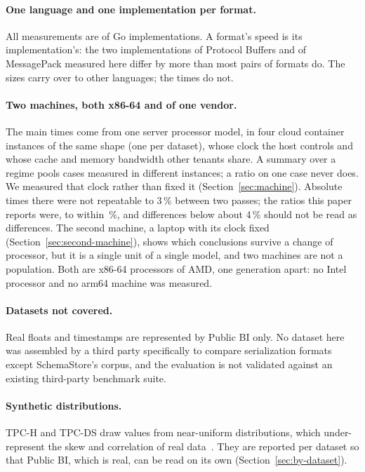 \paragraph{One language and one implementation per format.} All measurements
are of Go implementations. A format's speed is its implementation's: the
two implementations of Protocol Buffers and of MessagePack measured here
differ by more than most pairs of formats do. The sizes carry over to other
languages; the times do not.

\paragraph{Two machines, both x86-64 and of one vendor.} The main times come from one server
processor model, in four cloud container instances of the same shape (one
per dataset), whose clock the host controls and whose cache and memory
bandwidth other tenants share. A summary over a regime pools cases measured
in different instances; a ratio on one case never does. We measured that
clock rather than fixed it (Section~\ref{sec:machine}). Absolute times there
were not repeatable to 3\,\% between two passes; the ratios this paper
reports were, to within \,\%, and differences
below about 4\,\% should not be read as differences. The second machine, a
laptop with its clock fixed (Section~\ref{sec:second-machine}), shows which
conclusions survive a change of processor, but it is a single unit of a
single model, and two machines are not a population. Both are x86-64
processors of AMD, one generation apart: no Intel processor and no arm64
machine was measured.

\paragraph{Datasets not covered.} Real floats and timestamps are
represented by Public BI only. No dataset here was assembled by a third
party specifically to compare serialization formats except SchemaStore's
corpus, and the evaluation is not validated against an existing third-party
benchmark suite.

\paragraph{Synthetic distributions.} TPC-H and TPC-DS draw values from
near-uniform distributions, which under-represent the skew and correlation
of real data~\cite{vogelsgesang2018getreal}. They are reported per dataset
so that Public BI, which is real, can be read on its own
(Section~\ref{sec:by-dataset}).

